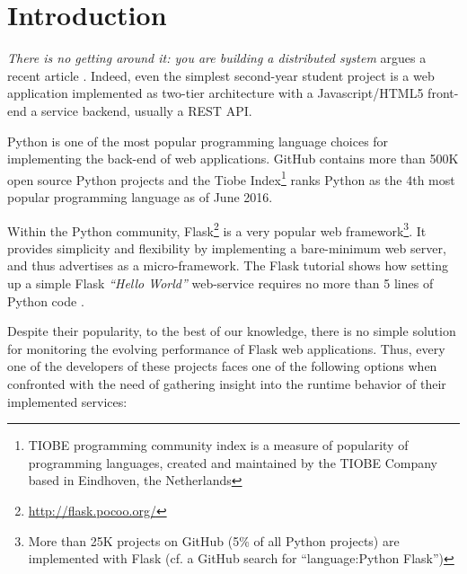 \documentclass[conference]{IEEEtran}
\begin{document}

\IEEEpeerreviewmaketitle



\section{Introduction}

{\em There is no getting around it: you are building a distributed system} argues a recent article \cite{cavage2013there}. Indeed, even the simplest second-year student project is a web application implemented as two-tier architecture with a Javascript/HTML5 front-end a service backend, usually a REST API.

Python is one of the most popular programming language choices for implementing the back-end of web applications. GitHub contains more than 500K open source Python projects and the Tiobe Index\footnote{TIOBE programming community index is a measure of popularity of programming languages, created and maintained by the TIOBE Company based in Eindhoven, the Netherlands} ranks Python as the 4th most popular programming language as of June 2016.
 
Within the Python community, Flask\footnote{\url{http://flask.pocoo.org/}} is a very popular web framework\footnote{More than 25K projects on GitHub (5\% of all Python projects) are implemented with Flask (cf. a GitHub search for ``language:Python Flask'')}. It provides simplicity and flexibility by implementing a bare-minimum web server, and thus advertises as a micro-framework. The Flask tutorial shows how setting up a simple Flask {\em ``Hello World''} web-service requires no more than 5 lines of Python code \cite{ flask:tutorial}.
 
Despite their popularity, to the best of our knowledge, there is no simple solution for monitoring the evolving performance of Flask web applications. Thus, every one of the developers of these projects faces one of the following options when confronted with the need of gathering insight into the runtime behavior of their implemented services: 
\end{document}
